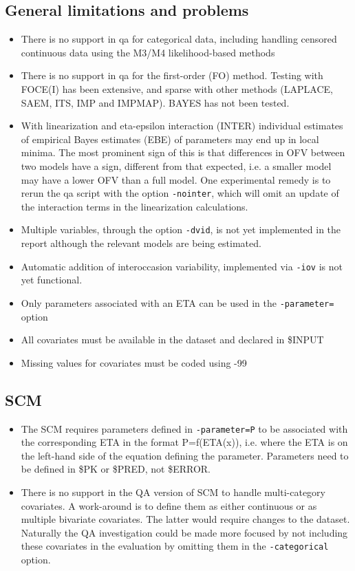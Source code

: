 \subsection{General limitations and problems}
\begin{itemize}
	\item There is no support in qa for categorical data, including handling censored continuous data using the M3/M4 likelihood-based methods
	\item There is no support in qa for the first-order (FO) method. Testing with FOCE(I) has been extensive, and sparse with other methods (LAPLACE, SAEM, ITS, IMP and IMPMAP). BAYES has not been tested. 
	\item With linearization and eta-epsilon interaction (INTER) individual estimates of empirical Bayes estimates (EBE) of parameters may end up in local minima. The most prominent sign of this is that differences in OFV between two models have a sign, different from that expected, i.e. a smaller model may have a lower OFV than a full model. One experimental remedy is to rerun the qa script with the option \verb|-nointer|, which will omit an update of the interaction terms in the linearization calculations.
	\item Multiple variables, through the option \verb|-dvid|, is not yet implemented in the report although the relevant models are being estimated.
	\item Automatic addition of interoccasion variability, implemented via \verb|-iov| is not yet functional.
	\item Only parameters associated with an ETA can be used in the \verb|-parameter=| option
    \item All covariates must be available in the dataset and declared in \$INPUT
    \item Missing values for covariates must be coded using -99
\end{itemize}

\subsection{SCM}
\begin{itemize}
	\item The SCM requires parameters defined in \verb|-parameter=P| to be associated with the corresponding ETA in the format P=f(ETA(x)), i.e. where the ETA is on the left-hand side of the equation defining the parameter. Parameters need to be defined in \$PK or \$PRED, not \$ERROR.

	\item There is no support in the QA version of SCM to handle multi-category covariates. A work-around is to define them as either continuous or as multiple bivariate covariates. The latter would require changes to the dataset. Naturally the QA investigation could be made more focused by not including these covariates in the evaluation by omitting them in the \verb|-categorical| option.
\end{itemize}

